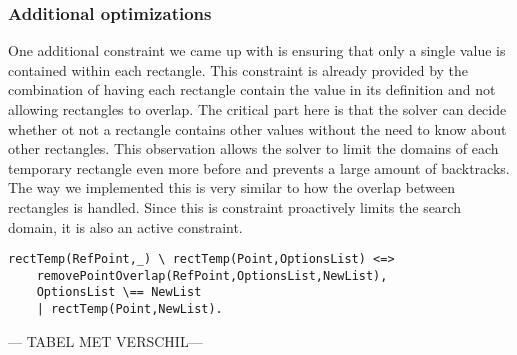 \subsubsection{Additional optimizations}

One additional constraint we came up with is ensuring that only a single value is contained within each rectangle. This constraint is already provided by the combination of having each rectangle contain the value in its definition and not allowing rectangles to overlap. The critical part here is that the solver can decide whether ot not a rectangle contains other values without the need to know about other rectangles. This observation allows the solver to limit the domains of each temporary rectangle even more before and prevents a large amount of backtracks. The way we implemented this is very similar to how the overlap between rectangles is handled. Since this is constraint proactively limits the search domain, it is also an active constraint.

\begin{lstlisting}
rectTemp(RefPoint,_) \ rectTemp(Point,OptionsList) <=>
	removePointOverlap(RefPoint,OptionsList,NewList),
	OptionsList \== NewList
	| rectTemp(Point,NewList).
\end{lstlisting}

--- TABEL MET VERSCHIL--- \\ \\


